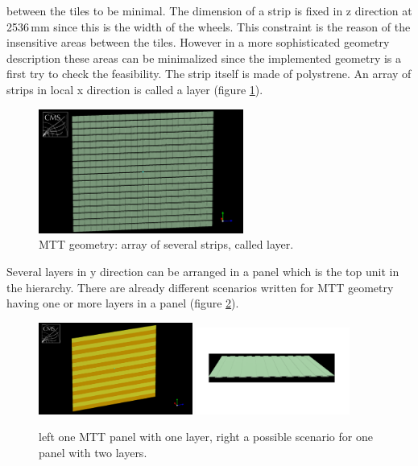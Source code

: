 			between the tiles to be minimal.
			The dimension of a strip is fixed in z direction at 2536\,mm since this is the width of the wheels.
			This constraint is the reason of the insensitive areas between the tiles.
			However in a more sophisticated geometry description these areas can be minimalized since the implemented geometry is a first try to check the feasibility. 
			The strip itself is made of polystrene.
			An array of strips in local x direction is called a layer (figure \ref{fig:layer}).
			\begin{figure}[htbp]
				\centering
				\includegraphics[width=0.6\textwidth]{Figures/erdogan/layer.png}
				\caption{MTT geometry: array of several strips, called layer.}
				\label{fig:layer}
			\end{figure}
			Several layers in y direction can be arranged in a panel which is the top unit in the hierarchy.
			There are already different scenarios written for MTT geometry having one or more layers in a panel (figure \ref{fig:panel}).
			\begin{figure}[htbp]
				\centering
				\includegraphics[width=0.45\textwidth]{Figures/erdogan/panel1.png}
				\includegraphics[width=0.45\textwidth]{Figures/erdogan/panel2.png}
				\caption{left one MTT panel with one layer, right a possible scenario for one panel with two layers.}
				\label{fig:panel}
			\end{figure}
